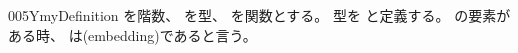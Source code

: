 \documentclass[index]{subfiles}
\begin{document}
\begin{myBlock}{005Y}{myDefinition}
  を階数、
  を型、
  を関数とする。
  型を
  と定義する。
  の要素がある時、
  は(embedding)であると言う。
\end{myBlock}
\end{document}
